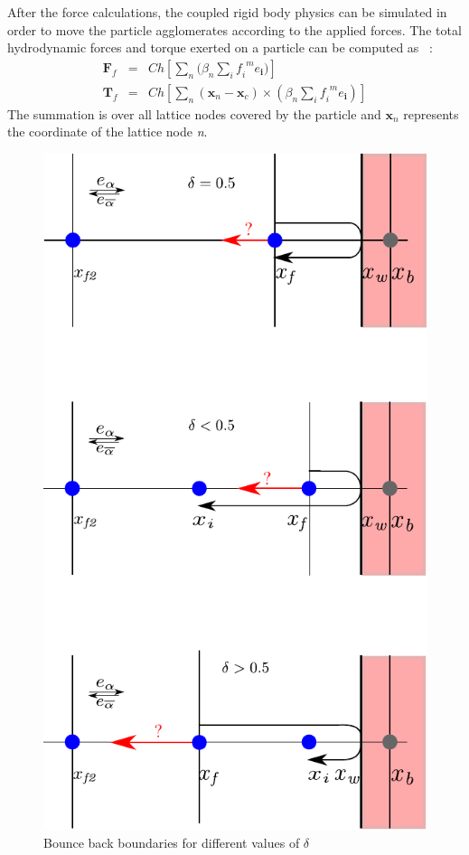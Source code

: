 After the force calculations, the coupled rigid body physics can be simulated in order to move the particle agglomerates according to the applied forces. The total hydrodynamic forces and torque exerted on a particle can be computed as ~\citep{Cook2004, Noble1998}:
\begin{align}
\mathbf{F}_{f} & = & \mathit{Ch}[\sum\limits_{\mathit{n}}{(\beta_{\mathit{n}} \sum\limits_{\mathit{i}}{\mathit{f_i}^{\mathit{ m}}\mathbf{\mathit{e}_i}}})] \\ 
\mathbf{T}_{f} & = & \mathit{Ch}[\sum\limits_{\mathit{n}}{(\mathbf{x}_{\mathit{n}}-\mathbf{x}_{\mathit{c}}) \times (\beta_{\mathit{n}} \sum\limits_{\mathit{i}}{\mathit{f_i}^{\mathit{ m}}\mathbf{\mathit{e}_i}})}]
\end{align}
The summation is over all lattice nodes covered by the particle and $\mathbf{x}_{\mathit{n}}$ represents the coordinate of the lattice node \textit{n}.
\begin{figure}[htbp]
\centering
\includegraphics[scale=1]{bouncemod}
\caption{Bounce back boundaries for different values of $\delta$}
\label{fig:bouncemod}
\end{figure}
